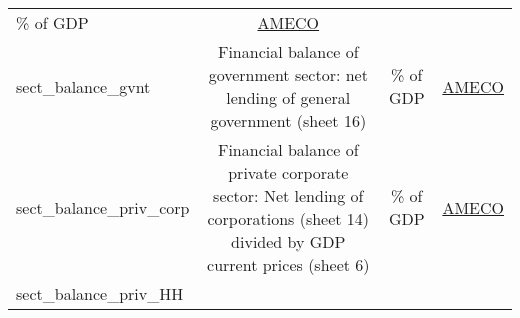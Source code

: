 \documentclass[]{article}
\begin{document}
\begin{longtable}[]{@{}lccc@{}}
\begin{minipage}[t]{0.24\columnwidth}
\% of GDP\strut
\end{minipage} & \begin{minipage}[t]{0.15\columnwidth}\centering\strut
\href{https://ec.europa.eu/info/business-economy-euro/indicators-statistics/economic-databases/macro-economic-database-ameco/download-annual-data-set-macro-economic-database-ameco_en}{AMECO}\strut
\end{minipage}\tabularnewline
\begin{minipage}[t]{0.14\columnwidth}\raggedright\strut
sect\_balance\_gvnt\strut
\end{minipage} & \begin{minipage}[t]{0.36\columnwidth}\centering\strut
Financial balance of government sector: net lending of general
government (sheet 16)\strut
\end{minipage} & \begin{minipage}[t]{0.24\columnwidth}\centering\strut
\% of GDP\strut
\end{minipage} & \begin{minipage}[t]{0.15\columnwidth}\centering\strut
\href{https://ec.europa.eu/info/business-economy-euro/indicators-statistics/economic-databases/macro-economic-database-ameco/download-annual-data-set-macro-economic-database-ameco_en}{AMECO}\strut
\end{minipage}\tabularnewline
\begin{minipage}[t]{0.14\columnwidth}\raggedright\strut
sect\_balance\_priv\_corp\strut
\end{minipage} & \begin{minipage}[t]{0.36\columnwidth}\centering\strut
Financial balance of private corporate sector: Net lending of
corporations (sheet 14) divided by GDP current prices (sheet 6)\strut
\end{minipage} & \begin{minipage}[t]{0.24\columnwidth}\centering\strut
\% of GDP\strut
\end{minipage} & \begin{minipage}[t]{0.15\columnwidth}\centering\strut
\href{https://ec.europa.eu/info/business-economy-euro/indicators-statistics/economic-databases/macro-economic-database-ameco/download-annual-data-set-macro-economic-database-ameco_en}{AMECO}\strut
\end{minipage}\tabularnewline
\begin{minipage}[t]{0.14\columnwidth}\raggedright\strut
sect\_balance\_priv\_HH\strut
\end{minipage} & \begin{minipage}[t]{0.36\columnwidth}\centering\strut

\end{minipage}
\end{longtable}
\end{document}
